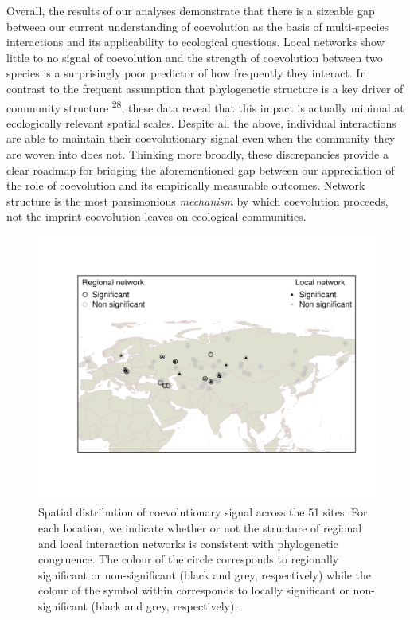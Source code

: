 \documentclass{nature}
\begin{document}
Overall, the results of our analyses demonstrate that there is a sizeable gap
between our current understanding of coevolution as the basis of multi-species
interactions and its applicability to ecological questions. Local networks
show little to no signal of coevolution and the strength of coevolution
between two species is a surprisingly poor predictor of how frequently they
interact. In contrast to the frequent assumption that phylogenetic structure
is a key driver of community structure \textsuperscript{28}, these data
reveal that this impact is actually minimal at ecologically relevant spatial
scales. Despite all the above, individual interactions are able to maintain
their coevolutionary signal even when the community they are woven into does
not. Thinking more broadly, these discrepancies provide a clear roadmap
for bridging the aforementioned gap between our appreciation of the role
of coevolution and its empirically measurable outcomes. Network structure
is the most parsimonious \emph{mechanism} by which coevolution proceeds,
not the imprint coevolution leaves on ecological communities.

\begin{figure}
\centering
\includegraphics{../figures/figure1.pdf}
\caption{Spatial distribution of coevolutionary signal across the 51
sites. For each location, we indicate whether or not the structure of
regional and local interaction networks is consistent with phylogenetic
congruence. The colour of the circle corresponds to regionally
significant or non-significant (black and grey, respectively) while the
colour of the symbol within corresponds to locally significant or
non-significant (black and grey, respectively).}
\end{figure}
\end{document}
